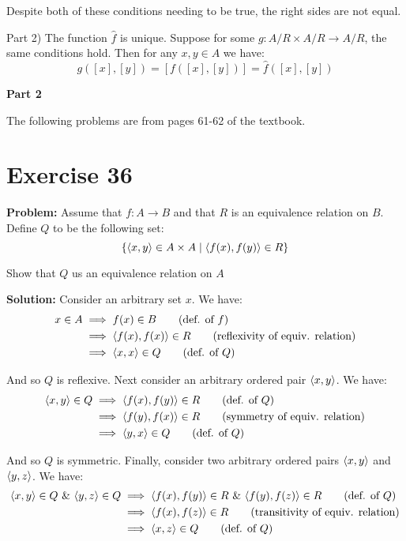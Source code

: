 \documentclass{article}
\begin{document}
Despite both of these conditions needing to be true, the right sides are not equal.
\bigskip

Part 2) The function $\hat{f}$ is unique. Suppose for some $g:A/R\times A/R\to A/R$, the same conditions hold. Then for any $x,y\in A$ we have:
\begin{equation*}
    g([x],[y])=[f([x],[y])]=\hat{f}([x],[y])
\end{equation*}
\medskip

\begin{center}
    \Large{\textbf{Part 2}}
\end{center}

The following problems are from pages 61-62 of the textbook.

\section*{Exercise 36}
\noindent\textbf{Problem:} Assume that $f:A\to B$ and that $R$ is an equivalence relation on $B$. Define $Q$ to be the following set:
\begin{equation*}
    \{\langle x,y\rangle\in A\times A\mid \langle f(x),f(y)\rangle\in R\}
\end{equation*}

Show that $Q$ us an equivalence relation on $A$
\bigskip

\noindent\textbf{Solution:} Consider an arbitrary set $x$. We have:
\begin{align*}
    x\in A&\implies f(x)\in B\tag{def. of $f$}\\
    &\implies\langle f(x),f(x)\rangle\in R\tag{reflexivity of equiv. relation}\\
    &\implies\langle x,x\rangle\in Q\tag{def. of $Q$}
\end{align*}

And so $Q$ is reflexive. Next consider an arbitrary ordered pair $\langle x,y\rangle$. We have:
\begin{align*}
    \langle x,y\rangle\in Q&\implies\langle f(x),f(y)\rangle\in R\tag{def. of $Q$}\\
    &\implies\langle f(y),f(x)\rangle\in R\tag{symmetry of equiv. relation}\\
    &\implies\langle y,x\rangle\in Q\tag{def. of $Q$}
\end{align*}

And so $Q$ is symmetric. Finally, consider two arbitrary ordered pairs $\langle x,y\rangle$ and $\langle y,z\rangle$. We have:
\begin{align*}
    \langle x,y\rangle\in Q\,\,\&\,\,\langle y,z\rangle\in Q&\implies\langle f(x),f(y)\rangle\in R\,\,\&\,\,\langle f(y),f(z)\rangle\in R\tag{def. of $Q$}\\
    &\implies\langle f(x),f(z)\rangle\in R\tag{transitivity of equiv. relation}\\
    &\implies\langle x,z\rangle\in Q\tag{def. of $Q$}
\end{align*}
\end{document}
